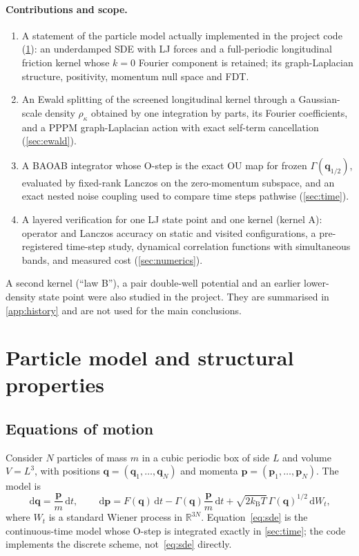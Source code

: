 \documentclass[11pt]{article}
\DeclareRobustCommand{\_}{\textunderscore\allowbreak}
\theoremstyle{remark}
\theoremstyle{definition}
\newcommand{\bq}{\mathbf{q}}
\newcommand{\bp}{\mathbf{p}}
\newcommand{\R}{\mathbb{R}}
\newcommand{\dd}{\,\mathrm{d}}
\newcommand{\kT}{k_{\mathrm B}T}
\begin{document}
\paragraph{Contributions and scope.}
\begin{enumerate}
\item A statement of the particle model actually implemented in the project code (\cref{sec:model}): an underdamped
SDE with LJ forces and a full-periodic longitudinal friction kernel whose $k=0$ Fourier component is retained; its
graph-Laplacian structure, positivity, momentum null space and FDT.
\item An Ewald splitting of the screened longitudinal kernel through a Gaussian-scale density $\rho_\kappa$ obtained
by one integration by parts, its Fourier coefficients, and a PPPM graph-Laplacian action with exact self-term
cancellation (\cref{sec:ewald}).
\item A BAOAB integrator whose O-step is the exact OU map for frozen $\Gamma(\bq_{1/2})$, evaluated by fixed-rank
Lanczos on the zero-momentum subspace, and an exact nested noise coupling used to compare time steps pathwise
(\cref{sec:time}).
\item A layered verification for one LJ state point and one kernel (kernel A): operator and Lanczos accuracy on
static and visited configurations, a pre-registered time-step study, dynamical correlation functions with
simultaneous bands, and measured cost (\cref{sec:numerics}).
\end{enumerate}
A second kernel (``law B''), a pair double-well potential and an earlier lower-density state point were also
studied in the project. They are summarised in \cref{app:history} and are not used for the main conclusions.

\section{Particle model and structural properties}\label{sec:model}

\subsection{Equations of motion}

Consider $N$ particles of mass $m$ in a cubic periodic box of side $L$ and volume $V=L^3$, with positions
$\bq=(\bq_1,\dots,\bq_N)$ and momenta $\bp=(\bp_1,\dots,\bp_N)$. The model is
\begin{equation}\label{eq:sde}
\dd\bq=\frac{\bp}{m}\dd t,\qquad
\dd\bp=F(\bq)\dd t-\Gamma(\bq)\frac{\bp}{m}\dd t+\sqrt{2\kT}\,\Gamma(\bq)^{1/2}\dd W_t,
\end{equation}
where $W_t$ is a standard Wiener process in $\R^{3N}$. Equation~\eqref{eq:sde} is the continuous-time model whose
O-step is integrated exactly in \cref{sec:time}; the code implements the discrete scheme, not~\eqref{eq:sde} directly.
\end{document}
